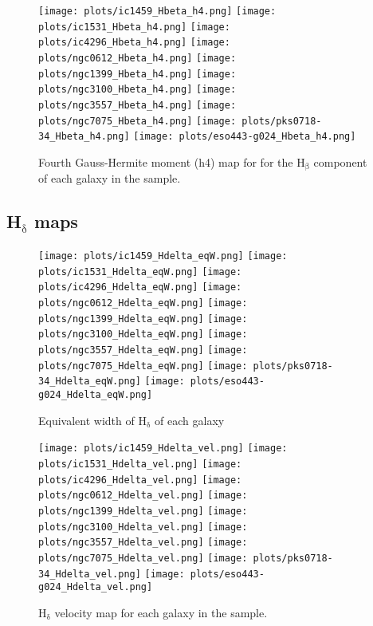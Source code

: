 \documentclass[fleqn,usenatbib,useAMS]{mnras}
\begin{document}
		\begin{figure*}
			\centering
			\texttt{[image: plots/ic1459\_Hbeta\_h4.png]}
			\texttt{[image: plots/ic1531\_Hbeta\_h4.png]}
			\texttt{[image: plots/ic4296\_Hbeta\_h4.png]}
			\texttt{[image: plots/ngc0612\_Hbeta\_h4.png]}
			\texttt{[image: plots/ngc1399\_Hbeta\_h4.png]}
			\texttt{[image: plots/ngc3100\_Hbeta\_h4.png]}
			\texttt{[image: plots/ngc3557\_Hbeta\_h4.png]}
			\texttt{[image: plots/ngc7075\_Hbeta\_h4.png]}
			\texttt{[image: plots/pks0718-34\_Hbeta\_h4.png]}
			\texttt{[image: plots/eso443-g024\_Hbeta\_h4.png]}
			\caption{Fourth Gauss-Hermite moment (h4) map for for the H$_\mathrm{\beta}$ component of each galaxy in the sample.}
			\label{fig:Hbeta_h4}
		\end{figure*}



	\subsection{H$_\mathrm{\delta}$ maps}
		\label{subsec:Hdeltamaps}

		\begin{figure*}
			\centering
			\texttt{[image: plots/ic1459\_Hdelta\_eqW.png]}
			\texttt{[image: plots/ic1531\_Hdelta\_eqW.png]}
			\texttt{[image: plots/ic4296\_Hdelta\_eqW.png]}
			\texttt{[image: plots/ngc0612\_Hdelta\_eqW.png]}
			\texttt{[image: plots/ngc1399\_Hdelta\_eqW.png]}
			\texttt{[image: plots/ngc3100\_Hdelta\_eqW.png]}
			\texttt{[image: plots/ngc3557\_Hdelta\_eqW.png]}
			\texttt{[image: plots/ngc7075\_Hdelta\_eqW.png]}
			\texttt{[image: plots/pks0718-34\_Hdelta\_eqW.png]}
			\texttt{[image: plots/eso443-g024\_Hdelta\_eqW.png]}
			\caption{Equivalent width of H$_\mathrm{\delta}$ of each galaxy}
			\label{fig:Hdelta_eqw}
		\end{figure*}

		\begin{figure*}
			\centering
			\texttt{[image: plots/ic1459\_Hdelta\_vel.png]}
			\texttt{[image: plots/ic1531\_Hdelta\_vel.png]}
			\texttt{[image: plots/ic4296\_Hdelta\_vel.png]}
			\texttt{[image: plots/ngc0612\_Hdelta\_vel.png]}
			\texttt{[image: plots/ngc1399\_Hdelta\_vel.png]}
			\texttt{[image: plots/ngc3100\_Hdelta\_vel.png]}
			\texttt{[image: plots/ngc3557\_Hdelta\_vel.png]}
			\texttt{[image: plots/ngc7075\_Hdelta\_vel.png]}
			\texttt{[image: plots/pks0718-34\_Hdelta\_vel.png]}
			\texttt{[image: plots/eso443-g024\_Hdelta\_vel.png]}
			\caption{H$_\mathrm{\delta}$ velocity map for each galaxy in the sample.}
			\label{fig:Hdelta_vel}
		\end{figure*}
\end{document}
